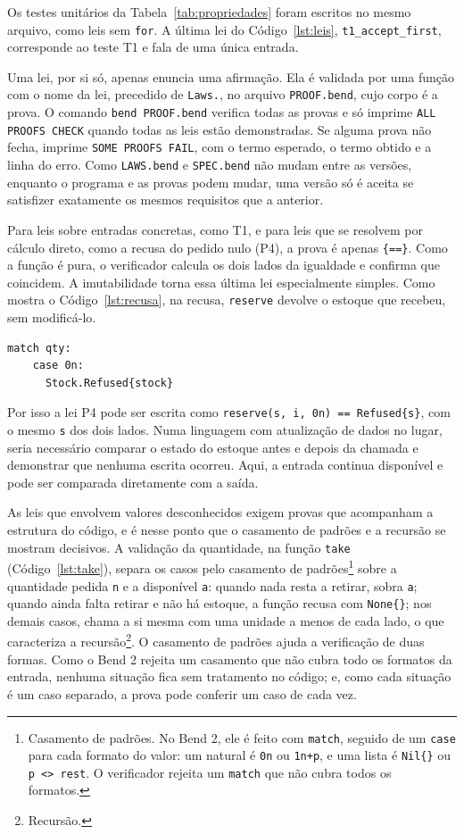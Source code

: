 Os testes unitários da Tabela~\ref{tab:propriedades} foram escritos no mesmo arquivo, como leis sem \texttt{for}. A última lei do Código~\ref{lst:leis}, \texttt{t1\_accept\_first}, corresponde ao teste T1 e fala de uma única entrada.

Uma lei, por si só, apenas enuncia uma afirmação. Ela é validada por uma função com o nome da lei, precedido de \texttt{Laws.}, no arquivo \texttt{PROOF.bend}, cujo corpo é a prova. O comando \texttt{bend PROOF.bend} verifica todas as provas e só imprime \texttt{ALL PROOFS CHECK} quando todas as leis estão demonstradas. Se alguma prova não fecha, imprime \texttt{SOME PROOFS FAIL}, com o termo esperado, o termo obtido e a linha do erro. Como \texttt{LAWS.bend} e \texttt{SPEC.bend} não mudam entre as versões, enquanto o programa e as provas podem mudar, uma versão só é aceita se satisfizer exatamente os mesmos requisitos que a anterior.

Para leis sobre entradas concretas, como T1, e para leis que se resolvem por cálculo direto, como a recusa do pedido nulo (P4), a prova é apenas \texttt{\{==\}}. Como a função é pura, o verificador calcula os dois lados da igualdade e confirma que coincidem. A imutabilidade torna essa última lei especialmente simples. Como mostra o Código~\ref{lst:recusa}, na recusa, \texttt{reserve} devolve o estoque que recebeu, sem modificá-lo.

\begin{lstlisting}[caption={Recusa do pedido nulo.},label={lst:recusa}]
  match qty:
    case 0n:
      Stock.Refused{stock}
\end{lstlisting}

Por isso a lei P4 pode ser escrita como \texttt{reserve(s, i, 0n) == Refused\{s\}}, com o mesmo \texttt{s} dos dois lados. Numa linguagem com atualização de dados no lugar, seria necessário comparar o estado do estoque antes e depois da chamada e demonstrar que nenhuma escrita ocorreu. Aqui, a entrada continua disponível e pode ser comparada diretamente com a saída.

As leis que envolvem valores desconhecidos exigem provas que acompanham a estrutura do código, e é nesse ponto que o casamento de padrões e a recursão se mostram decisivos. A validação da quantidade, na função \texttt{take} (Código~\ref{lst:take}), separa os casos pelo casamento de padrões\footnote{Casamento de padrões. No Bend 2, ele é feito com \texttt{match}, seguido de um \texttt{case} para cada formato do valor: um natural é \texttt{0n} ou \texttt{1n+p}, e uma lista é \texttt{Nil\{\}} ou \texttt{p <> rest}. O verificador rejeita um \texttt{match} que não cubra todos os formatos.} sobre a quantidade pedida \texttt{n} e a disponível \texttt{a}: quando nada resta a retirar, sobra \texttt{a}; quando ainda falta retirar e não há estoque, a função recusa com \texttt{None\{\}}; nos demais casos, chama a si mesma com uma unidade a menos de cada lado, o que caracteriza a recursão\footnote{Recursão.}. O casamento de padrões ajuda a verificação de duas formas. Como o Bend 2 rejeita um casamento que não cubra todo os formatos da entrada, nenhuma situação fica sem tratamento no código; e, como cada situação é um caso separado, a prova pode conferir um caso de cada vez.

